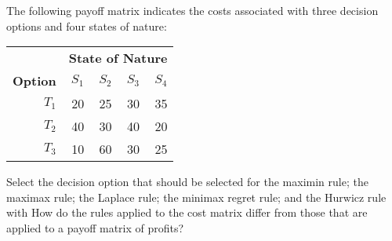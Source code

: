 \begin{exercises}
    \begin{exercise}
    \label{sea-07-39}
        The following payoff matrix indicates the costs associated with three decision options and four states of nature:
        \begin{table}[h]
        \centering
        \begin{tabular}{r r r r r}
        \toprule
         & \multicolumn{4}{c}{\textbf{State of Nature}} \\
        \textbf{Option} & \textbf{$S_1$} & \textbf{$S_2$} & \textbf{$S_3$} & \textbf{$S_4$} \\
        \midrule
        $T_1$ & 20 & 25 & 30 & 35 \\
        $T_2$ & 40 & 30 & 40 & 20 \\
        $T_3$ & 10 & 60 & 30 & 25 \\
        \bottomrule
        \end{tabular}
        \label{tab:sea-07-39} %
        \end{table}
        Select the decision option that should be selected for the maximin rule; the maximax rule; the Laplace rule; the minimax regret rule; and the Hurwicz rule with   How do the rules applied to the cost matrix differ from those that are applied to a payoff matrix of profits?
    \end{exercise}
    \begin{solution}
    \end{solution}
    

\end{exercises}
